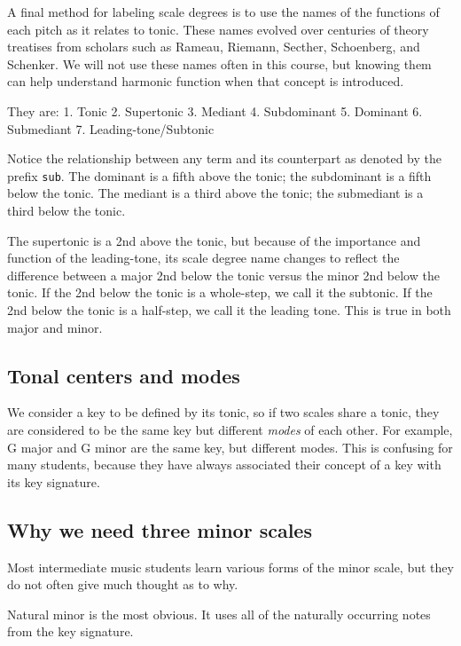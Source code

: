 \documentclass{book}
\begin{document}
A final method for labeling scale degrees is to use the names of the functions
of each pitch as it relates to tonic. These names evolved over centuries of
theory treatises from scholars such as Rameau, Riemann, Secther, Schoenberg,
and Schenker. We will not use these names often in this course, but knowing
them can help understand harmonic function when that concept is introduced.

They are: 1. Tonic 2. Supertonic 3. Mediant 4. Subdominant 5. Dominant 6.
Submediant 7. Leading-tone/Subtonic

Notice the relationship between any term and its counterpart as denoted by the
prefix \texttt{sub}. The dominant is a fifth above the tonic; the subdominant
is a fifth below the tonic. The mediant is a third above the tonic; the
submediant is a third below the tonic.

The supertonic is a 2nd above the tonic, but because of the importance and
function of the leading-tone, its scale degree name changes to reflect the
difference between a major 2nd below the tonic versus the minor 2nd below the
tonic. If the 2nd below the tonic is a whole-step, we call it the subtonic. If
the 2nd below the tonic is a half-step, we call it the leading tone. This is
true in both major and minor.

\hypertarget{tonal-centers-and-modes}{%
\subsection{Tonal centers and modes}\label{tonal-centers-and-modes}}

We consider a key to be defined by its tonic, so if two scales share a tonic,
they are considered to be the same key but different \emph{modes} of each
other. For example, G major and G minor are the same key, but different modes.
This is confusing for many students, because they have always associated their
concept of a key with its key signature.

\hypertarget{why-we-need-three-minor-scales}{%
\subsection{Why we need three minor
scales}\label{why-we-need-three-minor-scales}}

Most intermediate music students learn various forms of the minor scale, but
they do not often give much thought as to why.

Natural minor is the most obvious. It uses all of the naturally occurring
notes from the key signature.
\end{document}
